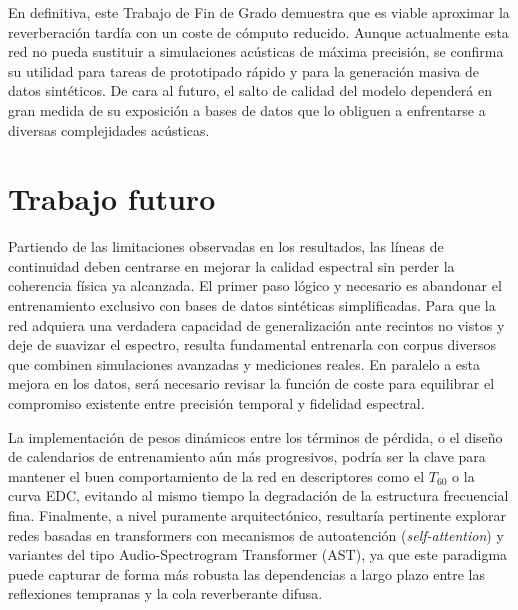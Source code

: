 En definitiva, este Trabajo de Fin de Grado demuestra que es viable aproximar la reverberación tardía con un coste de cómputo reducido. Aunque actualmente esta red no pueda sustituir a simulaciones acústicas de máxima precisión, se confirma su utilidad para tareas de prototipado rápido y para la generación masiva de datos sintéticos. De cara al futuro, el salto de calidad del modelo dependerá en gran medida de su exposición a bases de datos que lo obliguen a enfrentarse a diversas complejidades acústicas.

\section{Trabajo futuro}

Partiendo de las limitaciones observadas en los resultados, las líneas de continuidad deben centrarse en mejorar la calidad espectral sin perder la coherencia física ya alcanzada. El primer paso lógico y necesario es abandonar el entrenamiento exclusivo con bases de datos sintéticas simplificadas. Para que la red adquiera una verdadera capacidad de generalización ante recintos no vistos y deje de suavizar el espectro, resulta fundamental entrenarla con corpus diversos que combinen simulaciones avanzadas y mediciones reales. En paralelo a esta mejora en los datos, será necesario revisar la función de coste para equilibrar el compromiso existente entre precisión temporal y fidelidad espectral.

La implementación de pesos dinámicos entre los términos de pérdida, o el diseño de calendarios de entrenamiento aún más progresivos, podría ser la clave para mantener el buen comportamiento de la red en descriptores como el $T_{60}$ o la curva EDC, evitando al mismo tiempo la degradación de la estructura frecuencial fina. Finalmente, a nivel puramente arquitectónico, resultaría pertinente explorar redes basadas en transformers con mecanismos de autoatención (\textit{self-attention}) y variantes del tipo Audio-Spectrogram Transformer (AST), ya que este paradigma puede capturar de forma más robusta las dependencias a largo plazo entre las reflexiones tempranas y la cola reverberante difusa.
